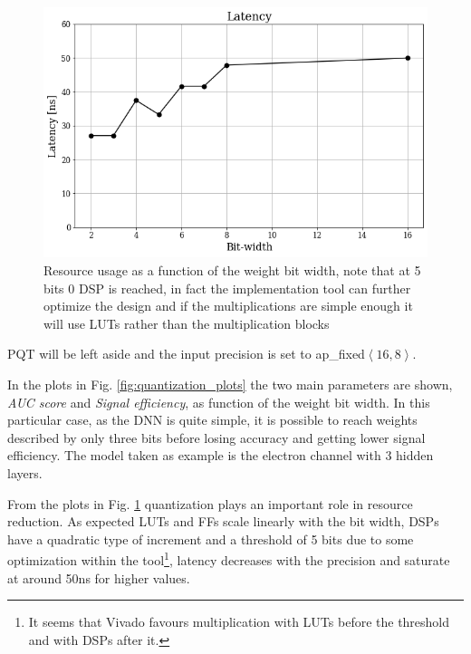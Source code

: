 \documentclass[../../main.tex]{subfiles}
\begin{document}
\begin{figure}[h]
\begin{minipage}[b]{0.5\linewidth}
    \vspace{2ex}
  \end{minipage}%
  \begin{minipage}[b]{0.5\linewidth}
    \centering
    \includegraphics[width=.9\linewidth]{sections/05/Images/Quant_Lat_1ele.png}
    \vspace{2ex}
  \end{minipage}
  \caption{Resource usage as a function of the weight bit width, note that at 5 bits 0 DSP is reached, in fact the implementation tool can further optimize the design and if the multiplications are simple enough it will use LUTs rather than the multiplication blocks} 
  \label{fig:quantization_resource}
\end{figure}


PQT will be left aside and the input precision is set to ap\_fixed$\left<16,8\right>$.


In the plots in Fig. \ref{fig:quantization_plots} the two main parameters are shown, \textit{AUC score} and \textit{Signal efficiency}, as function of the weight bit width. In this particular case, as the DNN is quite simple, it is possible to reach weights described by only three bits before losing accuracy and getting lower signal efficiency. The model taken as example is the electron channel with 3 hidden layers.


  
From the plots in Fig. \ref{fig:quantization_resource} quantization plays an important role in resource reduction. As expected LUTs and FFs scale linearly with the bit width, DSPs have a quadratic type of increment and a threshold of 5 bits due to some optimization within the tool\footnote{It seems that Vivado favours multiplication with LUTs before the threshold and with DSPs after it.}, latency decreases with the precision and saturate at around 50ns for higher values.
\end{document}
